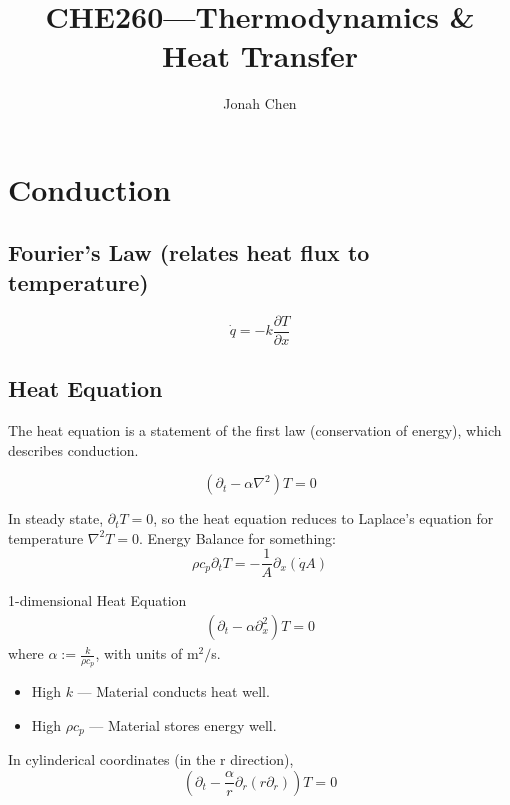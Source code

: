 \documentclass[a4paper]{article}
\title{CHE260---Thermodynamics \& Heat Transfer}
\author{Jonah Chen}
\numberwithin{equation}{section}
\begin{document}
    \maketitle
    \tableofcontents
	
    \section{Conduction}

	\subsection{Fourier's Law (relates heat flux to temperature)}
	\begin{equation}
		\dot q=-k\frac{\partial T}{\partial x}
	\end{equation}


	\subsection{Heat Equation}
	The heat equation is a statement of the first law (conservation of energy), which describes conduction.

	\begin{equation}
		(\partial_t-\alpha\nabla^2)T=0
	\end{equation}
	
	In steady state, $\partial_t T=0$, so the heat equation reduces to Laplace's equation for temperature $\nabla^2 T=0$.
	Energy Balance for something:	
	\begin{equation}
		\rho c_p\partial_t T=-\frac{1}{A}\partial_x(\dot qA)
	\end{equation}

	1-dimensional Heat Equation	
	\begin{align}
		(\partial_t-\alpha\partial_x^2)T=0
	\end{align}
	where $\alpha:=\frac{k}{\rho c_p}$, with units of m$^2/$s.
	\begin{itemize}
		\item High $k$ --- Material conducts heat well.
		\item High $\rho c_p$ --- Material stores energy well.
	\end{itemize}

	In cylinderical coordinates (in the r direction), 
	\begin{equation}
		(\partial_t-\frac{\alpha}{r}\partial_r(r\partial_r)) T = 0
	\end{equation}
	
\end{document}
